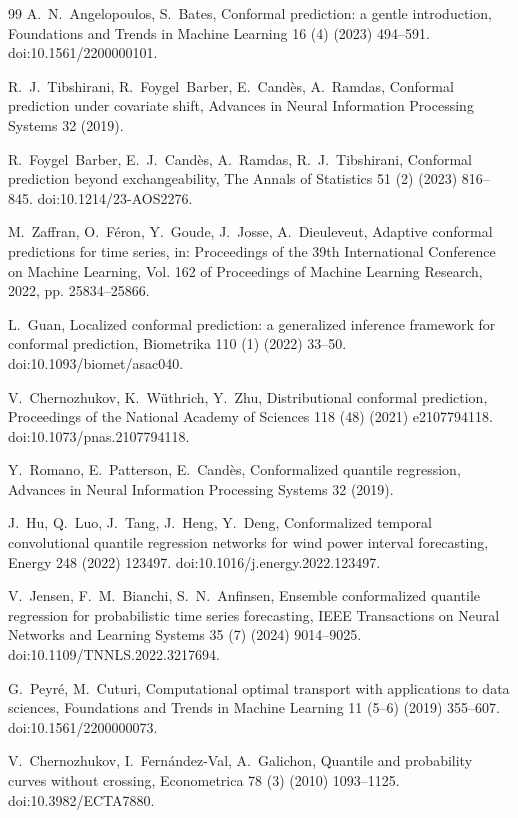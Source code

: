 \begin{thebibliography}{99}
A.~N.~Angelopoulos, S.~Bates,
Conformal prediction: a gentle introduction,
Foundations and Trends in Machine Learning 16 (4) (2023) 494--591.
doi:10.1561/2200000101.

R.~J.~Tibshirani, R.~Foygel~Barber, E.~Cand\`es, A.~Ramdas,
Conformal prediction under covariate shift,
Advances in Neural Information Processing Systems 32 (2019).

R.~Foygel~Barber, E.~J.~Cand\`es, A.~Ramdas, R.~J.~Tibshirani,
Conformal prediction beyond exchangeability,
The Annals of Statistics 51 (2) (2023) 816--845.
doi:10.1214/23-AOS2276.

M.~Zaffran, O.~F\'eron, Y.~Goude, J.~Josse, A.~Dieuleveut,
Adaptive conformal predictions for time series,
in: Proceedings of the 39th International Conference on Machine Learning, Vol. 162 of Proceedings of Machine Learning Research, 2022, pp. 25834--25866.

L.~Guan,
Localized conformal prediction: a generalized inference framework for conformal prediction,
Biometrika 110 (1) (2022) 33--50.
doi:10.1093/biomet/asac040.

V.~Chernozhukov, K.~W\"uthrich, Y.~Zhu,
Distributional conformal prediction,
Proceedings of the National Academy of Sciences 118 (48) (2021) e2107794118.
doi:10.1073/pnas.2107794118.

Y.~Romano, E.~Patterson, E.~Cand\`es,
Conformalized quantile regression,
Advances in Neural Information Processing Systems 32 (2019).

J.~Hu, Q.~Luo, J.~Tang, J.~Heng, Y.~Deng,
Conformalized temporal convolutional quantile regression networks for wind power interval forecasting,
Energy 248 (2022) 123497.
doi:10.1016/j.energy.2022.123497.

V.~Jensen, F.~M.~Bianchi, S.~N.~Anfinsen,
Ensemble conformalized quantile regression for probabilistic time series forecasting,
IEEE Transactions on Neural Networks and Learning Systems 35 (7) (2024) 9014--9025.
doi:10.1109/TNNLS.2022.3217694.

G.~Peyr\'e, M.~Cuturi,
Computational optimal transport with applications to data sciences,
Foundations and Trends in Machine Learning 11 (5--6) (2019) 355--607.
doi:10.1561/2200000073.

V.~Chernozhukov, I.~Fern\'andez-Val, A.~Galichon,
Quantile and probability curves without crossing,
Econometrica 78 (3) (2010) 1093--1125.
doi:10.3982/ECTA7880.


\end{thebibliography}
